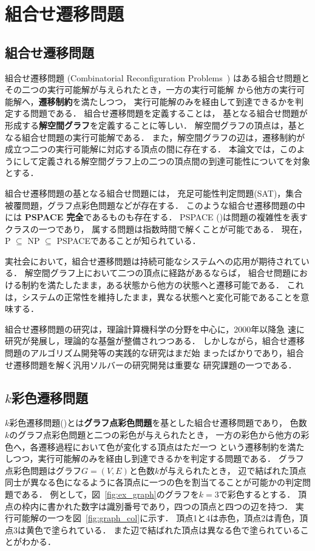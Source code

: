 \chapter{組合せ遷移問題} \label{chap:background}

\section{組合せ遷移問題}
組合せ遷移問題 (Combinatorial Reconfiguration Problems~\cite{Ito18:tohoku})
はある組合せ問題とその二つの実行可能解が与えられたとき，一方の実行可能解
から他方の実行可能解へ，\textbf{遷移制約}を満たしつつ，
実行可能解のみを経由して到達できるかを判定する問題である．
組合せ遷移問題を定義することは，
基となる組合せ問題が形成する\textbf{解空間グラフ}を定義することに等しい．
解空間グラフの頂点は，基となる組合せ問題の実行可能解である． 
また，解空間グラフの辺は，遷移制約が成立つ二つの実行可能解に対応する頂点の間に存在する．
本論文では，このようにして定義される解空間グラフ上の二つの頂点間の到達可能性についてを対象とする．

組合せ遷移問題の基となる組合せ問題には，
充足可能性判定問題(SAT)，集合被覆問題，グラフ点彩色問題などが存在する．
このような組合せ遷移問題の中には \textbf{PSPACE 完全}であるものも存在する． 
PSPACE (\cite{Kuriyama13:ieice})は問題の複雑性を表すクラスの一つであり，
属する問題は指数時間で解くことが可能である． 
現在，P $\subseteq$ NP $\subseteq$ PSPACEであることが知られている．

実社会において，組合せ遷移問題は持続可能なシステムへの応用が期待されている． 
解空間グラフ上において二つの頂点に経路があるならば，
組合せ問題における制約を満たしたまま，ある状態から他方の状態へと遷移可能である． 
これは，システムの正常性を維持したまま，異なる状態へと変化可能であることを意味する．

組合せ遷移問題の研究は，理論計算機科学の分野を中心に，2000年以降急
速に研究が発展し，理論的な基盤が整備されつつある．
しかしながら，組合せ遷移問題のアルゴリズム開発等の実践的な研究はまだ始
まったばかりであり，組合せ遷移問題を解く汎用ソルバーの研究開発は重要な
研究課題の一つである．

\section{$k$彩色遷移問題}
$k$彩色遷移問題(\cite{BC2009:tcs})とは\textbf{グラフ点彩色問題}を基とした組合せ遷移問題であり， 
色数$k$のグラフ点彩色問題と二つの彩色が与えられたとき，
一方の彩色から他方の彩色へ，各遷移過程において色が変化する頂点はただ一つ
という遷移制約を満たしつつ，実行可能解のみを経由し到達できるかを判定する問題である．
グラフ点彩色問題はグラフ$G=(V, E)$と色数$k$が与えられたとき，
辺で結ばれた頂点同士が異なる色になるように各頂点に一つの色を割当てることが可能かの判定問題である． 
例として，図~\ref{fig:ex_graph}のグラフを$k=3$で彩色するとする．
頂点の枠内に書かれた数字は識別番号であり，四つの頂点と四つの辺を持つ．
実行可能解の一つを図~\ref{fig:graph_col}に示す．
頂点1と4は赤色，頂点2は青色，頂点3は黄色で塗られている．
また辺で結ばれた頂点は異なる色で塗られていることがわかる．

